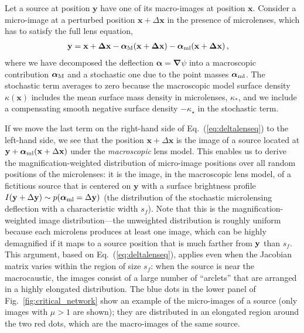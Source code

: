 \documentclass{aastex6}
\newcommand{\bt}[1]{\mathbf #1}
\newcommand{\refeq}[1]{Eq.~(\ref{eq:#1})}
\newcommand{\reffig}[1]{Fig.~\ref{fig:#1}}
\def\bfx{\boldsymbol{x}}
\begin{document}
Let a source at position $\bt y$ have one of its macro-images at position $\bt x$. Consider a micro-image at a perturbed position $\bt x + \Delta \bt x$ in the presence of microlenses, which has to satisfy the full lens equation,
\begin{align}
\label{eq:deltalenseq}
  \bf y & = \bf x + \Delta \bf x - \bm{\alpha}_{\rm M}(\bf x + \Delta \bt x) - 
  \bm{\alpha}_{\rm ml}(\bfx + \Delta \bt x)\, \mbox{,}
\end{align}
where we have decomposed the deflection $\bm{\alpha} = \bm\nabla \psi$ into a macroscopic contribution $\bm{\alpha}_{\rm M}$ and a stochastic one due to the point masses $\bm{\alpha}_{\rm ml}$. The stochastic term averages to zero because the macroscopic model surface density $\kappa(\bt x)$ includes the mean surface mass density in microlenses, $\kappa_*$, and we include a compensating smooth negative surface density $-\kappa_\star$ in the stochastic term.

If we move the last term on the right-hand side of \refeq{deltalenseq} to the left-hand side, we see that the position $\bt x + \Delta \bt x$ is the image of a source located at $\bt y + \bm{\alpha}_{\rm ml}(\bt x + \Delta \bt x)$ under the {\em macroscopic} lens model. This enables us to derive the magnification-weighted distribution of micro-image positions over all random positions of the microlenses: it is the image, in the macroscopic lens model, of a fictitious source that is centered on $\bt y$ with a surface brightness profile $I(\bt y + \Delta \bt y) \sim p(\bm{\alpha}_{\rm ml} = \Delta \bt y)$ (the distribution of the stochastic microlensing deflection with a characteristic width $s_f$). Note that this is the magnification-weighted image distribution---the unweighted distribution is roughly uniform because each microlens produces at least one image, which can be highly demagnified if it maps to a source position that is much farther from $\bf y$ than $s_f$. This argument, based on \refeq{deltalenseq}, applies even when the Jacobian matrix varies within the region of size $s_f$: when the source is near the macrocaustic, the images consist of a large number of ``arclets'' that are arranged in a highly elongated distribution. The blue dots in the lower panel of \reffig{critical_network} show an example of the micro-images of a source (only images with $\mu > 1$ are shown); they are distributed in an elongated region around the two red dots, which are the macro-images of the same source.
\end{document}
